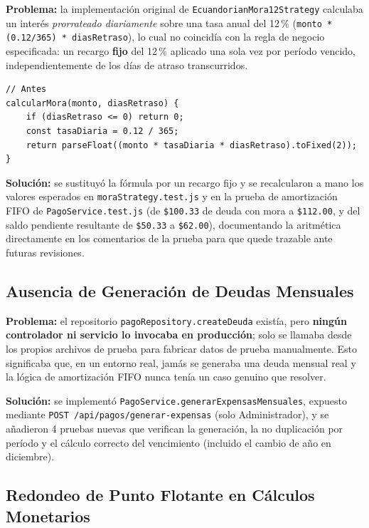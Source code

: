 \documentclass[12pt,a4paper]{article}
\begin{document}
\textbf{Problema:} la implementación original de \texttt{EcuandorianMora12Strategy}
calculaba un interés \emph{prorrateado diariamente} sobre una tasa anual del 12\,\%
(\texttt{monto * (0.12/365) * diasRetraso}), lo cual no coincidía con la regla de negocio
especificada: un recargo \textbf{fijo} del 12\,\% aplicado una sola vez por período
vencido, independientemente de los días de atraso transcurridos.

\begin{lstlisting}[caption={Fórmula anterior (incorrecta respecto a la regla de negocio)}]
// Antes
calcularMora(monto, diasRetraso) {
    if (diasRetraso <= 0) return 0;
    const tasaDiaria = 0.12 / 365;
    return parseFloat((monto * tasaDiaria * diasRetraso).toFixed(2));
}
\end{lstlisting}

\textbf{Solución:} se sustituyó la fórmula por un recargo fijo y se recalcularon a mano
los valores esperados en \texttt{moraStrategy.test.js} y en la prueba de amortización FIFO
de \texttt{PagoService.test.js} (de \texttt{\$100.33} de deuda con mora a
\texttt{\$112.00}, y del saldo pendiente resultante de \texttt{\$50.33} a
\texttt{\$62.00}), documentando la aritmética directamente en los comentarios de la
prueba para que quede trazable ante futuras revisiones.

\subsection{Ausencia de Generación de Deudas Mensuales}

\textbf{Problema:} el repositorio \texttt{pagoRepository.createDeuda} existía, pero
\textbf{ningún controlador ni servicio lo invocaba en producción}; solo se llamaba desde
los propios archivos de prueba para fabricar datos de prueba manualmente. Esto significaba
que, en un entorno real, jamás se generaba una deuda mensual real y la lógica de
amortización FIFO nunca tenía un caso genuino que resolver.

\textbf{Solución:} se implementó \texttt{PagoService.generarExpensasMensuales}, expuesto
mediante \texttt{POST /api/pagos/generar-expensas} (solo Administrador), y se añadieron
4 pruebas nuevas que verifican la generación, la no duplicación por período y el cálculo
correcto del vencimiento (incluido el cambio de año en diciembre).

\subsection{Redondeo de Punto Flotante en Cálculos Monetarios}
\end{document}
